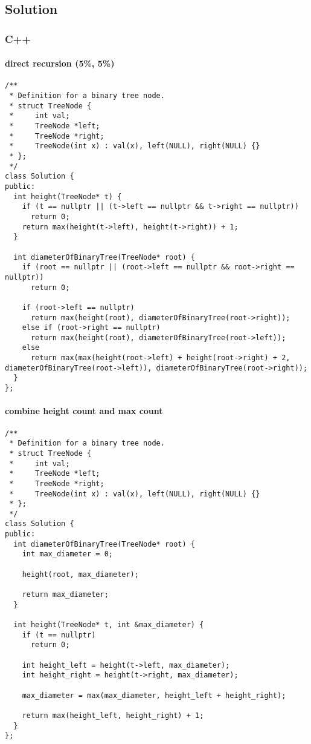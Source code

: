 \documentclass[11pt]{article}
\begin{document}
\subsection{Solution}
\label{sec:org3d181ef}
\subsubsection{C++}
\label{sec:org942c909}
\paragraph{direct recursion (5\%, 5\%)}
\label{sec:org74e0dee}
\begin{verbatim}
/**
 * Definition for a binary tree node.
 * struct TreeNode {
 *     int val;
 *     TreeNode *left;
 *     TreeNode *right;
 *     TreeNode(int x) : val(x), left(NULL), right(NULL) {}
 * };
 */
class Solution {
public:
  int height(TreeNode* t) {
    if (t == nullptr || (t->left == nullptr && t->right == nullptr))
      return 0; 
    return max(height(t->left), height(t->right)) + 1;
  }

  int diameterOfBinaryTree(TreeNode* root) {
    if (root == nullptr || (root->left == nullptr && root->right == nullptr))
      return 0;

    if (root->left == nullptr)
      return max(height(root), diameterOfBinaryTree(root->right));
    else if (root->right == nullptr)
      return max(height(root), diameterOfBinaryTree(root->left));
    else
      return max(max(height(root->left) + height(root->right) + 2, diameterOfBinaryTree(root->left)), diameterOfBinaryTree(root->right));
  }
};

\end{verbatim}
\paragraph{combine height count and max count}
\label{sec:orgab3ae81}

\begin{verbatim}
/**
 * Definition for a binary tree node.
 * struct TreeNode {
 *     int val;
 *     TreeNode *left;
 *     TreeNode *right;
 *     TreeNode(int x) : val(x), left(NULL), right(NULL) {}
 * };
 */
class Solution {
public:
  int diameterOfBinaryTree(TreeNode* root) {
    int max_diameter = 0;

    height(root, max_diameter);

    return max_diameter;
  }

  int height(TreeNode* t, int &max_diameter) {
    if (t == nullptr)
      return 0;

    int height_left = height(t->left, max_diameter);
    int height_right = height(t->right, max_diameter);

    max_diameter = max(max_diameter, height_left + height_right);

    return max(height_left, height_right) + 1;
  }
};

\end{verbatim}
\end{document}
